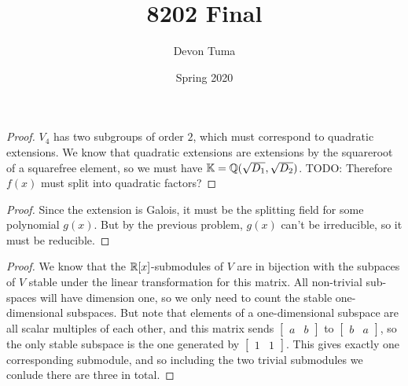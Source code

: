 \documentclass[11pt]{article}
\title{8202 Final}
\author{Devon Tuma}
\date{Spring 2020}
\begin{document}
\maketitle

\begin{proof}
  $V_4$ has two subgroups of order $2$, which must correspond to quadratic extensions.
  We know that quadratic extensions are extensions by the squareroot of a squarefree element, so we must have $\mathbb{K} = \mathbb{Q}(\sqrt{D_1}, \sqrt{D_2})$.
  TODO: Therefore $f(x)$ must split into quadratic factors?
\end{proof}

\begin{proof}
  Since the extension is Galois, it must be the splitting field for some polynomial $g(x)$.
  But by the previous problem, $g(x)$ can't be irreducible, so it must be reducible.
\end{proof}



\begin{proof}
  We know that the $\mathbb{R}[x]$-submodules of $V$ are in bijection with the subpaces of $V$ stable under the linear transformation for this matrix.
  All non-trivial sub-spaces will have dimension one, so we only need to count the stable one-dimensional subspaces.
  But note that elements of a one-dimensional subspace are all scalar multiples of each other,
  and this matrix sends $\begin{bmatrix}a & b\end{bmatrix}$ to $\begin{bmatrix}b & a\end{bmatrix}$,
  so the only stable subspace is the one generated by $\begin{bmatrix}1 & 1\end{bmatrix}$.
  This gives exactly one corresponding submodule, and so including the two trivial submodules we conlude there are three in total.
\end{proof}
\end{document}
